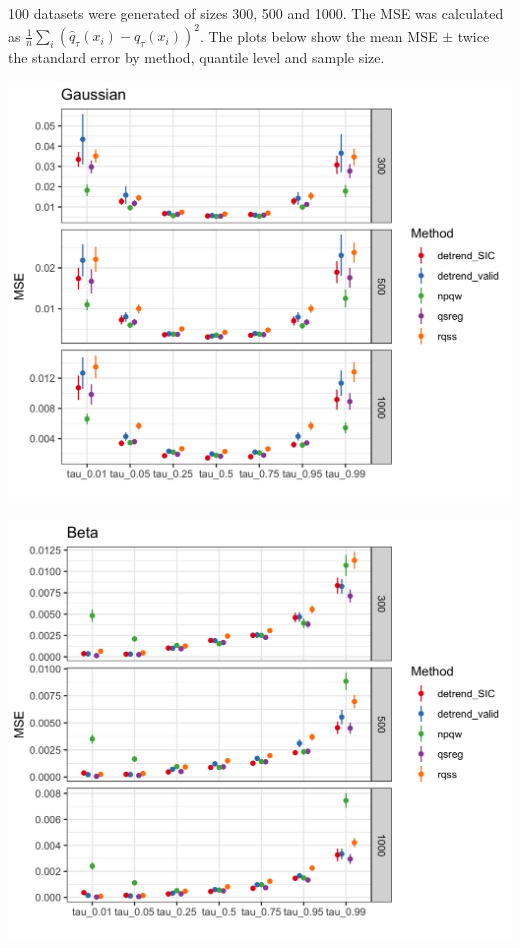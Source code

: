 \documentclass[]{article}
\begin{document}
100 datasets were generated of sizes 300, 500 and 1000. The MSE was calculated as $\frac{1}{n}\sum_i (\hat{q}_{\tau}(x_i) - q_\tau(x_i))^2$. The plots below show the mean MSE $\pm$ twice the standard error by method, quantile level and sample size. 
	 
\includegraphics[width=\linewidth]{Figures/gaus_mse.png}	

\includegraphics[width=\linewidth]{Figures/shapebeta_mse.png}
\end{document}
